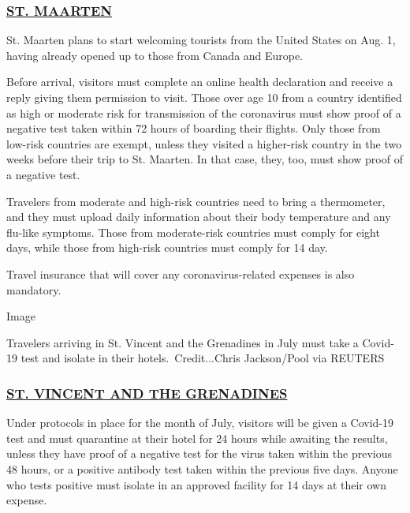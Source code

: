 \hypertarget{st-maarten}{%
\subsubsection{\texorpdfstring{\href{https://stmaartenupdates.com}{ST.
MAARTEN}}{ST. MAARTEN}}\label{st-maarten}}

St. Maarten plans to start welcoming tourists from the United States on
Aug. 1, having already opened up to those from Canada and Europe.

Before arrival, visitors must complete an online health declaration and
receive a reply giving them permission to visit. Those over age 10 from
a country identified as high or moderate risk for transmission of the
coronavirus must show proof of a negative test taken within 72 hours of
boarding their flights. Only those from low-risk countries are exempt,
unless they visited a higher-risk country in the two weeks before their
trip to St. Maarten. In that case, they, too, must show proof of a
negative test.

Travelers from moderate and high-risk countries need to bring a
thermometer, and they must upload daily information about their body
temperature and any flu-like symptoms. Those from moderate-risk
countries must comply for eight days, while those from high-risk
countries must comply for 14 day.

Travel insurance that will cover any coronavirus-related expenses is
also mandatory.

Image

Travelers arriving in St. Vincent and the Grenadines in July must take a
Covid-19 test and isolate in their hotels.~Credit...Chris Jackson/Pool
via REUTERS

\hypertarget{st-vincent-and-the-grenadines}{%
\subsubsection{\texorpdfstring{\href{https://www.facebookcorewwwi.onion/svgairports/photos/pcb.934154330347186/934153757013910/}{ST.
VINCENT AND THE
GRENADINES}}{ST. VINCENT AND THE GRENADINES}}\label{st-vincent-and-the-grenadines}}

Under protocols in place for the month of July, visitors will be given a
Covid-19 test and must quarantine at their hotel for 24 hours while
awaiting the results, unless they have proof of a negative test for the
virus taken within the previous 48 hours, or a positive antibody test
taken within the previous five days. Anyone who tests positive must
isolate in an approved facility for 14 days at their own expense.

